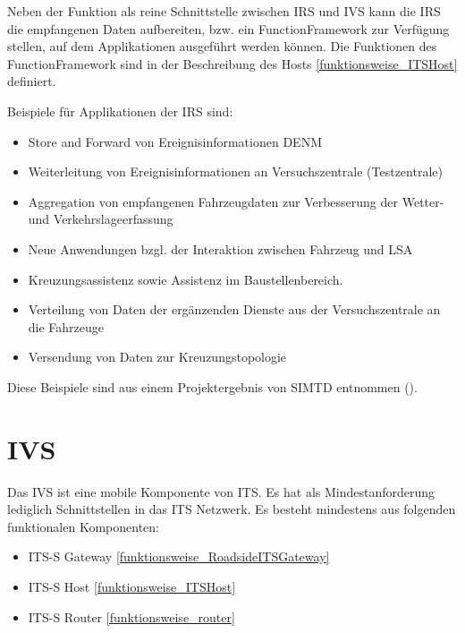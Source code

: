 Neben der Funktion als reine Schnittstelle zwischen \ac{IRS} und \ac{IVS} kann die \ac{IRS} die empfangenen Daten aufbereiten, bzw. ein FunctionFramework zur Verfügung stellen, auf dem Applikationen ausgeführt werden können. Die Funktionen des FunctionFramework sind in der Beschreibung des Hosts \ref{funktionsweise_ITSHost} definiert.  

Beispiele für Applikationen der \ac{IRS} sind:
\begin{itemize}
	\item Store and Forward von Ereignisinformationen \ac{DENM}
	\item Weiterleitung von Ereignisinformationen an Versuchszentrale (Testzentrale)
	\item Aggregation von empfangenen Fahrzeugdaten zur Verbesserung der Wetter- und Verkehrslageerfassung
	\item Neue Anwendungen bzgl. der Interaktion zwischen Fahrzeug und LSA
	\item  Kreuzungsassistenz sowie Assistenz im Baustellenbereich.
	\item Verteilung von Daten der ergänzenden Dienste aus der Versuchszentrale an die Fahrzeuge
	\item Versendung von Daten zur Kreuzungstopologie
\end{itemize}

Diese Beispiele sind aus einem Projektergebnis von \ac{SIMTD} entnommen (\cite{simtd-D12.1}). 



\section{IVS}
Das \ac{IVS} ist eine mobile Komponente von \ac{ITS}. Es hat als Mindestanforderung lediglich Schnittstellen in das \ac{ITS} Netzwerk. Es besteht mindestens aus folgenden funktionalen Komponenten:
\begin{itemize}
	\item  ITS-S Gateway \ref{funktionsweise_RoadsideITSGateway}
	\item ITS-S Host \ref{funktionsweise_ITSHost}
	\item ITS-S Router \ref{funktionsweise_router} 
\end{itemize}


